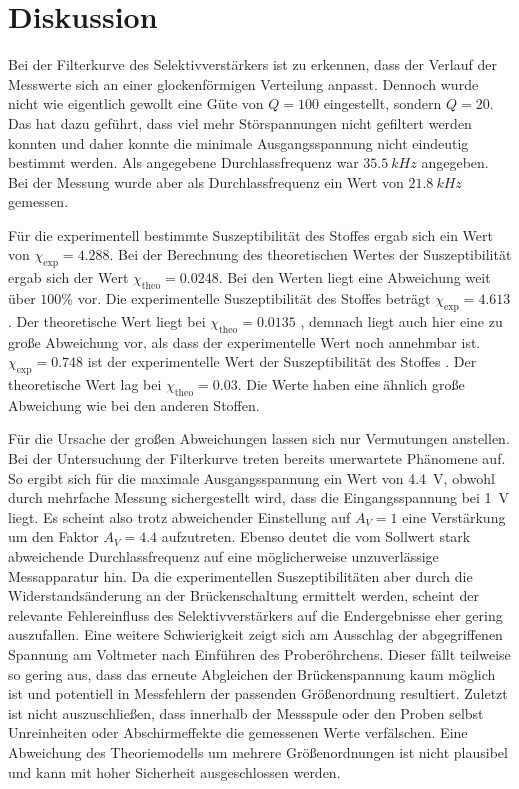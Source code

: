 \section{Diskussion}
\label{sec:diskussion}

Bei der Filterkurve des Selektivverstärkers ist zu erkennen, dass der Verlauf der Messwerte sich an einer glockenförmigen Verteilung
anpasst. Dennoch wurde nicht wie eigentlich gewollt eine Güte von $Q = 100$ eingestellt, sondern $Q = 20$. 
Das hat dazu geführt, dass viel mehr Störspannungen nicht gefiltert werden konnten und daher konnte die minimale Ausgangsspannung
nicht eindeutig bestimmt werden. Als angegebene Durchlassfrequenz war $\SI{35.5}{kHz}$ angegeben. Bei der Messung wurde aber
als Durchlassfrequenz ein Wert von $\SI{21.8}{kHz}$ gemessen.

Für die experimentell bestimmte Suszeptibilität des Stoffes  ergab sich ein Wert von $\chi_\text{exp} = 4.288$. 
Bei der Berechnung des theoretischen Wertes der Suszeptibilität ergab sich der Wert $\chi_\text{theo} = 0.0248$. Bei den Werten
liegt eine Abweichung weit über $100\%$ vor.
Die experimentelle Suszeptibilität des Stoffes  beträgt $\chi_\text{exp} = 4.613$. Der theoretische Wert liegt bei
$\chi_\text{theo} = 0.0135$ , demnach liegt auch hier eine zu große Abweichung vor, als dass der experimentelle Wert noch annehmbar ist.
$\chi_\text{exp} = 0.748$ ist der experimentelle Wert der Suszeptibilität des Stoffes . Der theoretische Wert lag bei
$\chi_\text{theo} = 0.03$. Die Werte haben eine ähnlich große Abweichung wie bei den anderen Stoffen.

Für die Ursache der großen Abweichungen lassen sich nur Vermutungen anstellen. Bei der Untersuchung der Filterkurve treten bereits
unerwartete Phänomene auf. So ergibt sich für die maximale Ausgangsspannung ein Wert von \qty{4.4}{\volt}, obwohl durch mehrfache
Messung sichergestellt wird, dass die Eingangsspannung bei \qty{1}{\volt} liegt. Es scheint also trotz abweichender Einstellung auf
$A_V = 1$ eine Verstärkung um den Faktor $A_V = \num{4.4}$ aufzutreten. Ebenso deutet die vom Sollwert stark abweichende
Durchlassfrequenz auf eine möglicherweise unzuverlässige Messapparatur hin. Da die experimentellen Suszeptibilitäten aber
durch die Widerstandsänderung an der Brückenschaltung ermittelt werden, scheint der relevante Fehlereinfluss des Selektivverstärkers
auf die Endergebnisse eher gering auszufallen. Eine weitere Schwierigkeit zeigt sich am Ausschlag der
abgegriffenen Spannung am Voltmeter nach Einführen des Proberöhrchens. Dieser fällt teilweise so gering aus, dass das erneute Abgleichen
der Brückenspannung kaum möglich ist und potentiell in Messfehlern der passenden Größenordnung resultiert. Zuletzt ist nicht
auszuschließen, dass innerhalb der Messspule oder den Proben selbst Unreinheiten oder Abschirmeffekte die gemessenen Werte verfälschen.
Eine Abweichung des Theoriemodells um mehrere Größenordnungen ist nicht plausibel und kann mit hoher Sicherheit ausgeschlossen werden.

